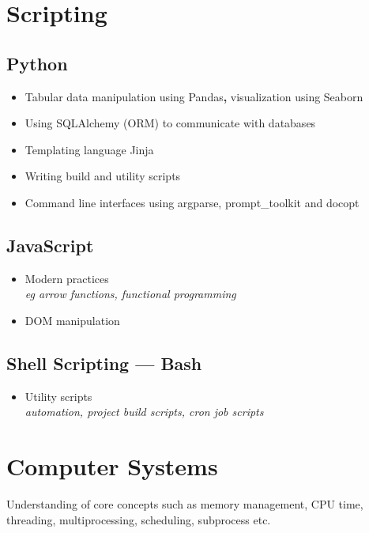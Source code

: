 \documentclass[a4paper, 13pt, draft]{article}
\newcommand{\proglang}[1]{%
    \subsection*{#1}
}
\begin{document}
\section*{\color{col1} \Large{Scripting} \color{default}}

\proglang{Python}

\begin{itemize}
    \setlength\itemsep{0em}
\item
    Tabular data manipulation using Pandas\textbf{,} visualization using
    Seaborn
\item
    Using SQLAlchemy (ORM) to communicate with databases
\item
    Templating language Jinja
\item
    Writing build and utility scripts
\item
    Command line interfaces using argparse, prompt\_toolkit and docopt \\
\end{itemize}

\begin{multicols}{2}

    \proglang{JavaScript} 

    \begin{itemize}
	\setlength\itemsep{0em}
    \item Modern practices \\ 
	\textit{eg arrow functions, functional programming}
    \item DOM manipulation 
\end{itemize}

\proglang{Shell Scripting --- Bash}

\begin{itemize}		
    \item Utility scripts \\ 
    \textit{automation, project build scripts, cron job scripts}
\end{itemize}		

\end{multicols}

\section*{\color{col1} \Large{Computer Systems} \color{default}}

Understanding of core concepts such as memory management, CPU time,
threading, multiprocessing, scheduling, subprocess etc.
\end{document}

